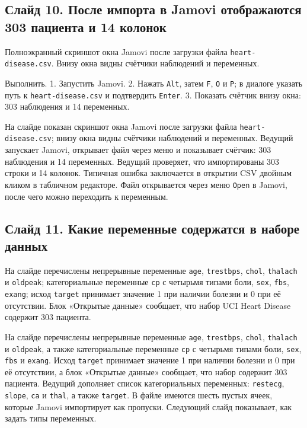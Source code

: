 \documentclass[11pt,a4paper]{article}
\begin{document}
\subsection*{Слайд 10. После импорта в Jamovi отображаются 303 пациента и 14 колонок}
\begin{onslide}
Полноэкранный скриншот окна Jamovi после загрузки файла \texttt{heart-disease.csv}. Внизу окна видны счётчики наблюдений и переменных.
\end{onslide}
\begin{jamovi}
Выполнить. 1. Запустить Jamovi. 2. Нажать \texttt{Alt}, затем \texttt{F}, \texttt{O} и \texttt{P}; в диалоге указать путь к \texttt{heart-disease.csv} и подтвердить \texttt{Enter}. 3. Показать счётчик внизу окна: 303 наблюдения и 14 переменных.
\end{jamovi}
На слайде показан скриншот окна Jamovi после загрузки файла \texttt{heart-disease.csv}; внизу окна видны счётчики наблюдений и переменных. Ведущий запускает Jamovi, открывает файл через меню и показывает счётчик: 303 наблюдения и 14 переменных. Ведущий проверяет, что импортированы 303 строки и 14 колонок. Типичная ошибка заключается в открытии CSV двойным кликом в табличном редакторе. Файл открывается через меню \texttt{Open} в Jamovi, после чего можно переходить к переменным.

\subsection*{Слайд 11. Какие переменные содержатся в наборе данных}
\begin{onslide}
На слайде перечислены непрерывные переменные \texttt{age}, \texttt{trestbps}, \texttt{chol}, \texttt{thalach} и \texttt{oldpeak}; категориальные переменные \texttt{cp} с четырьмя типами боли, \texttt{sex}, \texttt{fbs}, \texttt{exang}; исход \texttt{target} принимает значение 1 при наличии болезни и 0 при её отсутствии. Блок «Открытые данные» сообщает, что набор UCI Heart Disease содержит 303 пациента.
\end{onslide}
На слайде перечислены непрерывные переменные \texttt{age}, \texttt{trestbps}, \texttt{chol}, \texttt{thalach} и \texttt{oldpeak}, а также категориальные переменные \texttt{cp} с четырьмя типами боли, \texttt{sex}, \texttt{fbs} и \texttt{exang}. Исход \texttt{target} принимает значение 1 при наличии болезни и 0 при её отсутствии, а блок «Открытые данные» сообщает, что набор содержит 303 пациента. Ведущий дополняет список категориальных переменных: \texttt{restecg}, \texttt{slope}, \texttt{ca} и \texttt{thal}, а также \texttt{target}. В файле имеются шесть пустых ячеек, которые Jamovi импортирует как пропуски. Следующий слайд показывает, как задать типы переменных.
\end{document}
